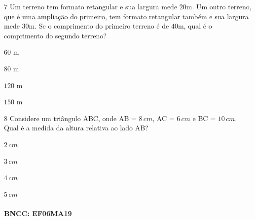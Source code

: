 {\num{7}  Um terreno tem formato retangular e sua largura mede $20$m. Um outro
terreno, que é uma ampliação do primeiro, tem formato retangular também
e sua largura mede $30$m. Se o comprimento do primeiro terreno é de $40$m,
qual é o comprimento do segundo terreno?

\begin{escolha}
\item $60$ m
\item $80$ m
\item $120$ m
\item $150$ m
\end{escolha}



\num{8}  Considere um triângulo ABC, onde AB = $8\,cm$, AC = $6\,cm$ e BC = $10\,cm$.
Qual é a medida da altura relativa ao lado AB?

\begin{escolha}
\item $2\,cm$
\item $3\,cm$
\item $4\,cm$
\item $5\,cm$
\end{escolha}

\paragraph{BNCC: EF06MA19}

}
